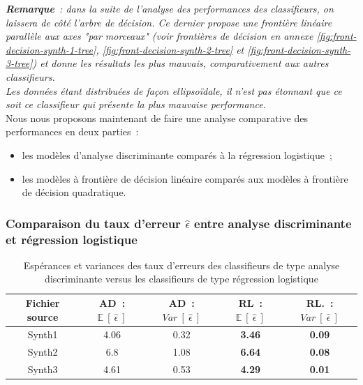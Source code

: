 \documentclass[a4paper,10pt]{report}
\begin{document}
\textit{\textbf{Remarque}~: dans la suite de l'analyse des performances des classifieurs, on laissera de côté l'arbre de décision. Ce dernier propose une frontière linéaire parallèle aux axes "par morceaux" (voir frontières de décision en annexe \autoref{fig:front-decision-synth-1-tree}, \autoref{fig:front-decision-synth-2-tree} et \autoref{fig:front-decision-synth-3-tree}) et donne les résultats les plus mauvais, comparativement aux autres classifieurs.\\
Les données étant distribuées de façon ellipsoïdale, il n'est pas étonnant que ce soit ce classifieur qui présente la plus mauvaise performance.}\\

Nous nous proposons maintenant de faire une analyse comparative des performances en deux parties~:
\begin{itemize}
	\item les modèles d'analyse discriminante comparés à la régression logistique~;
	\item les modèles à frontière de décision linéaire comparés aux modèles à frontière de décision quadratique.
\end{itemize}

\subsubsection{Comparaison du taux d'erreur $\hat{\epsilon}$ entre analyse discriminante et régression logistique}

\begin{table}[H]
	\centering
	\captionsetup{justification=centering, margin=3cm}
	\begin{tabular}{c|c|c|c|c}
		Fichier source & AD~: $\mathbb{E}\ [\ \hat{\epsilon}\ ]$ & AD~: $Var\ [\ \hat{\epsilon}\ ]$ & RL~: $\mathbb{E}\ [\ \hat{\epsilon}\ ]$ & RL.~: $Var\ [\ \hat{\epsilon}\ ]$ \\ 
		\hline
		Synth1 & 4.06  & 0.32  & \textbf{3.46}  & \textbf{0.09}  \\ 
		Synth2 & 6.8  & 1.08 & \textbf{6.64}  & \textbf{0.08} \\ 
		Synth3 & 4.61 & 0.53 & \textbf{4.29}  & \textbf{0.01}  \\ 
	\end{tabular}
	\caption{\small Espérances et variances des taux d'erreurs des classifieurs de type analyse discriminante versus les classifieurs de type régression logistique}
	\label{table:2-1-erreur-data-synth-mean-var-ad-vs-regression}
\end{table}
\end{document}
